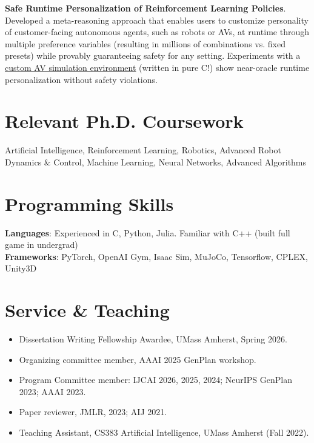 \documentclass[letterpaper,11pt]{article}
\begin{document}
\textbf{Safe Runtime Personalization of Reinforcement Learning Policies}. Developed a meta-reasoning approach that enables users to customize personality of customer-facing autonomous agents, such as robots or AVs, at runtime through multiple preference variables (resulting in millions of combinations vs. fixed presets) while provably guaranteeing safety for any setting. Experiments with a \href{https://github.com/bhatiaabhinav/Awesim}{custom AV simulation environment} (written in pure C!) show near-oracle runtime personalization without safety violations.
\vspace{-0.5em}

\section*{Relevant Ph.D. Coursework}
Artificial Intelligence, Reinforcement Learning, Robotics, Advanced Robot Dynamics \& Control, Machine Learning, Neural Networks, Advanced Algorithms



\section*{Programming Skills}
\vspace{-0.5em}
\textbf{Languages}: Experienced in C, Python, Julia. Familiar with C++ (built full game in undergrad)\\
\textbf{Frameworks}: PyTorch, OpenAI Gym, Isaac Sim, MuJoCo, Tensorflow, CPLEX, Unity3D

\section*{Service \& Teaching}
\vspace{-0.5em}
\begin{itemize}
    \setlength\itemsep{0em}
  \item Dissertation Writing Fellowship Awardee, UMass Amherst, Spring 2026.
  \item Organizing committee member, AAAI 2025 GenPlan workshop.
  \item Program Committee member: IJCAI 2026, 2025, 2024; NeurIPS GenPlan 2023; AAAI 2023.
  \item Paper reviewer, JMLR, 2023; AIJ 2021.
  \item Teaching Assistant, CS383 Artificial Intelligence, UMass Amherst (Fall 2022).
\end{itemize}
\vspace{-1em}
\end{document}
